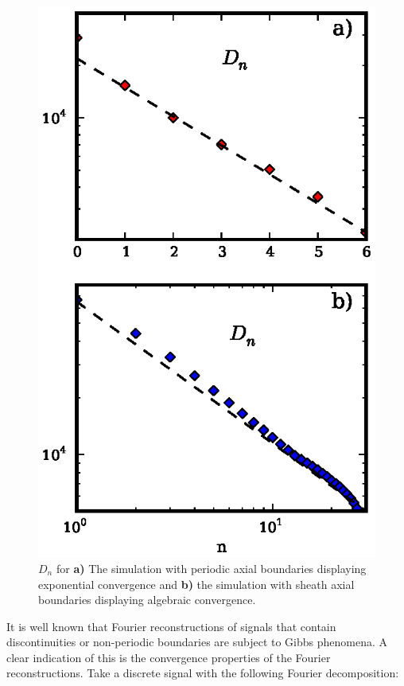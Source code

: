 \documentclass[showpacs,preprintnumbers,amsmath,amssymb,superscriptaddress,aip]{revtex4-1}
\begin{document}
\begin{figure}[!htbp]
\includegraphics[]{fourier_convergence}
\hfil
\caption{$D_n$ for \textbf{a)} The simulation with periodic axial
boundaries displaying exponential convergence and \textbf{b)} the simulation with sheath axial boundaries displaying algebraic convergence.}
\label{fourier_convergence}
\end{figure}

It is well known that Fourier reconstructions of signals that contain discontinuities or non-periodic boundaries are subject to Gibbs phenomena. A clear indication of this is the
convergence properties of the Fourier reconstructions. Take a discrete signal with the following Fourier decomposition:
\end{document}
